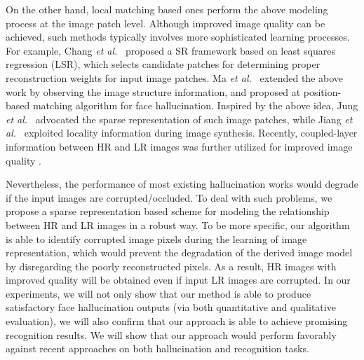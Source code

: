 {On the other hand, local matching based ones perform the above modeling process at the image patch level. Although improved image quality can be achieved, such methods typically involves more sophisticated learning processes. For example, Chang \emph{et al.}~\cite{superRes} proposed a SR framework based on least squares regression (LSR), which selects candidate patches for determining proper reconstruction weights for input image patches. Ma \emph{et al.}~\cite{positionMa} extended the above work by observing the image structure information, and proposed at position-based matching algorithm for face hallucination. Inspired by the above idea, Jung \emph{et al.}~\cite{convex} advocated the sparse representation of such image patches, while Jiang \emph{et al.}~\cite{Jiang_TMM2014} exploited locality information during image synthesis. Recently, coupled-layer information between HR and LR images was further utilized for improved image quality \cite{coupledLayer}.

Nevertheless, the performance of most existing hallucination works would degrade if the input images are corrupted/occluded. To deal with such problems, we propose a sparse representation based scheme for modeling the relationship between HR and LR images in a robust way. To be more specific, our algorithm is able to identify corrupted image pixels during the learning of image representation, which would prevent the degradation of the derived image model by disregarding the poorly reconstructed pixels. As a result, HR images with improved quality will be obtained even if input LR images are corrupted. In our experiments, we will not only show that our method is able to produce satisfactory face hallucination outputs (via both quantitative and qualitative evaluation), we will also confirm that our approach is able to achieve promising recognition results. We will show that our approach would perform favorably against recent approaches on both hallucination and recognition tasks.




}
